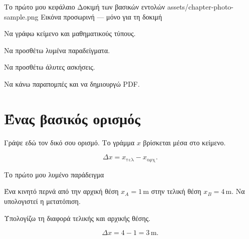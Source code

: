 
\BookChapterPhoto
  {Το πρώτο μου κεφάλαιο}
  {Δοκιμή των βασικών εντολών}
  {assets/chapter-photo-sample.png}
  {Εικόνα προσωρινή — μόνο για τη δοκιμή}
  {
    \item Να γράφω κείμενο και μαθηματικούς τύπους.
    \item Να προσθέτω λυμένα παραδείγματα.
    \item Να προσθέτω άλυτες ασκήσεις.
    \item Να κάνω παραπομπές και να δημιουργώ PDF.
  }

\section{Ένας βασικός ορισμός}
Γράψε εδώ τον δικό σου ορισμό. Το γράμμα \(x\) βρίσκεται μέσα στο κείμενο.

\[\Delta x=x_{\mathrm{τελ}}-x_{\mathrm{αρχ}}.\]

\begin{workedexample}{Το πρώτο μου λυμένο παράδειγμα}
  \begin{ProblemBox}
  Ένα κινητό περνά από την αρχική θέση \(x_A=1\,\mathrm{m}\)
  στην τελική θέση \(x_B=4\,\mathrm{m}\). Να υπολογιστεί η μετατόπιση.
  \end{ProblemBox}

  \begin{ThinkBox}
  Υπολογίζω τη διαφορά τελικής και αρχικής θέσης.
  \end{ThinkBox}

  \SolutionHeading
  \[\Delta x=4-1=3\,\mathrm{m}.\]
\end{workedexample}

